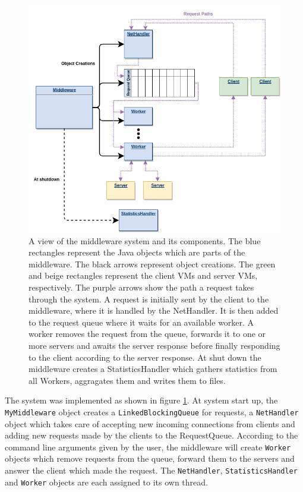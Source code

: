 \documentclass[11pt,a4paper]{article}
\begin{document}
\begin{figure}
\centering
\includegraphics[width=1\textwidth]{system_diagram}
\caption{A view of the middleware system and its components. The blue rectangles represent the Java objects which are parts of the middleware. The black arrows represent object creations. The green and beige rectangles represent the client VMs and server VMs, respectively. The purple arrows show the path a request takes through the system. A request is initially sent by the client to the middleware, where it is handled by the NetHandler. It is then added to the request queue where it waits for an available worker. A worker removes the request from the queue, forwards it to one or more servers and awaits the server response before finally responding to the client according to the server response. At shut down the middleware creates a StatisticsHandler which gathers statistics from all Workers, aggragates them and writes them to files.}
\label{fig:system_diagram}
\end{figure}

The system was implemented as shown in figure \ref{fig:system_diagram}. At system start up, the \texttt{MyMiddleware} object creates a \texttt{LinkedBlockingQueue} for requests, a \texttt{NetHandler} object which takes care of accepting new incoming connections from clients and adding new requests made by the clients to the RequestQueue. According to the command line arguments given by the user, the middleware will create \texttt{Worker} objects which remove requests from the queue, forward them to the servers and answer the client which made the request. The \texttt{NetHandler}, \texttt{StatisticsHandler} and \texttt{Worker} objects are each assigned to its own thread.\\
\end{document}
